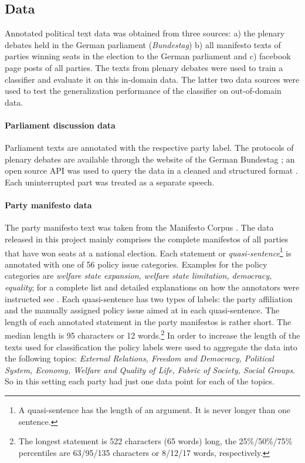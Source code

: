 \documentclass[11pt]{article}
\begin{document}
\subsection{Data}
Annotated political text data was obtained from three sources: a) the plenary debates held in the German parliament ({\em Bundestag}) b) all manifesto texts of parties winning seats in the election to the German parliament and c) facebook page posts of all parties. The texts from plenary debates were used to train a classifier and evaluate it on this in-domain data. The latter two data sources were used to test the generalization performance of the classifier on out-of-domain data. 

\paragraph{Parliament discussion data} Parliament texts are annotated with the respective party label. The protocols of plenary debates are available through the website of the German Bundestag \cite{bundestag}; an open source API was used to query the data in a cleaned and structured format \cite{bundestag-github}. Each uninterrupted part was treated as a separate speech. 

\paragraph{Party manifesto data}
The party manifesto text was taken from the Manifesto Corpus  \cite{manifesto}. The data released in this project mainly comprises the complete manifestos of all parties that have won seats at a national election. Each statement or {\em quasi-sentence}\footnote{A quasi-sentence has the length of an argument. It is never longer than one sentence.} is annotated with one of 56 policy issue categories. Examples for the policy categories are {\em welfare state expansion, welfare state limitation, democracy, equality}; for a complete list and detailed explanations on how the annotators were instructed see \cite{leftright}. Each quasi-sentence has  two types of labels: the party affiliation and the manually assigned policy issue aimed at in each quasi-sentence. The length of each annotated statement in the party manifestos is rather short. The median length is 95 characters or 12 words.\footnote{The longest statement is 522 characters (65 words) long, the 25\%/50\%/75\% percentiles are 63/95/135 characters or 8/12/17 words, respectively.} 
In order to increase the length of the texts used for classification the policy labels were used to aggregate the data into the following topics: {\em External Relations, Freedom and Democracy, Political System, Economy, Welfare and Quality of Life, Fabric of Society, Social Groups}. So in this setting each party had just one data point for each of the topics. 
\end{document}
